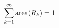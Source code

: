 \documentclass[preview]{standalone}
\begin{document}
\begin{align*}
\special{dvisvgm:raw <g id='unique000'>}\sum_{k=1}^\infty\operatorname{area}(R_k)=1\special{dvisvgm:raw </g>}
\end{align*}
\end{document}
